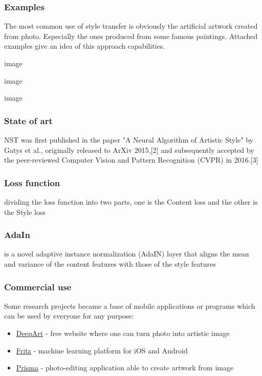 \documentclass[../Main.tex]{subfiles}
\begin{document}
        
    \subsubsection{Examples}
    The most common use of style transfer is obviously the artificial artwork created from photo. Especially the ones produced from some famous paintings. Attached examples give an idea of this approach capabilities. 
    
    image
    
    image
    
    image

    \subsubsection{State of art}
    NST was first published in the paper "A Neural Algorithm of Artistic Style" by Gatys et al., originally released to ArXiv 2015,[2] and subsequently accepted by the peer-reviewed Computer Vision and Pattern Recognition (CVPR) in 2016.[3]
    
    \subsubsection{Loss function}
    
    dividing the loss function into two parts, one is the Content loss and the other is the Style loss
    
    \subsubsection{AdaIn}
    
    
    is \cite{huang2017adain} a novel adaptive instance normalization (AdaIN) layer that aligns the mean and variance of the content features with those of the style features

    
    \subsubsection{Commercial use}
    Some research projects became a base of mobile applications or programs which can be used by everyone for any purpose:
    \begin{itemize}
        \item \href{https://deepart.io}{DeepArt} - free website where one can turn photo into artistic image
        \item \href{https://www.fritz.ai}{Fritz} - machine learning platform for iOS and Android 
        \item \href{https://prisma-ai.com}{Prisma} - photo-editing application able to create artwork from image
    \end{itemize}
    
\end{document}
